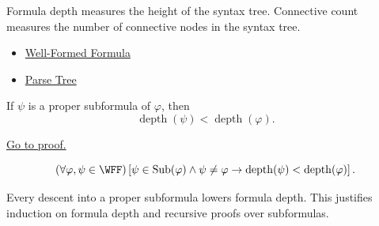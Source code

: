 \begin{remark*}[Interpretation]
Formula depth measures the height of the syntax tree. Connective count measures the number of connective nodes in the syntax tree.
\end{remark*}

\begin{dependencies}
\begin{itemize}
  \item \hyperref[def:well-formed-formula]{Well-Formed Formula}
  \item \hyperref[def:parse-tree-propositional-logic]{Parse Tree}
\end{itemize}
\end{dependencies}
\begin{tcolorbox}[colback=lembox, colframe=lemborder, arc=2pt,
  left=6pt, right=6pt, top=4pt, bottom=4pt,
  title={\small\textbf{Lemma (Proper Subformula Depth)}},
  fonttitle=\small\bfseries]
\begin{lemma}
\label{lem:proper-subformula-depth-propositional-logic}
If \(\psi\) is a proper subformula of \(\varphi\), then
\[
\operatorname{depth}(\psi)<\operatorname{depth}(\varphi).
\]

\noindent\hyperref[prf:proper-subformula-depth-propositional-logic]{Go to proof.}
\end{lemma}
\end{tcolorbox}

\begin{remark*}
\[
(\forall\varphi,\psi\in\WFF)
\left[
\psi\in\operatorname{Sub}(\varphi)\land \psi\ne\varphi
\to
\operatorname{depth}(\psi)<\operatorname{depth}(\varphi)
\right].
\]
\end{remark*}

\begin{remark*}[Interpretation]
Every descent into a proper subformula lowers formula depth. This justifies induction on formula depth and recursive proofs over subformulas.
\end{remark*}


